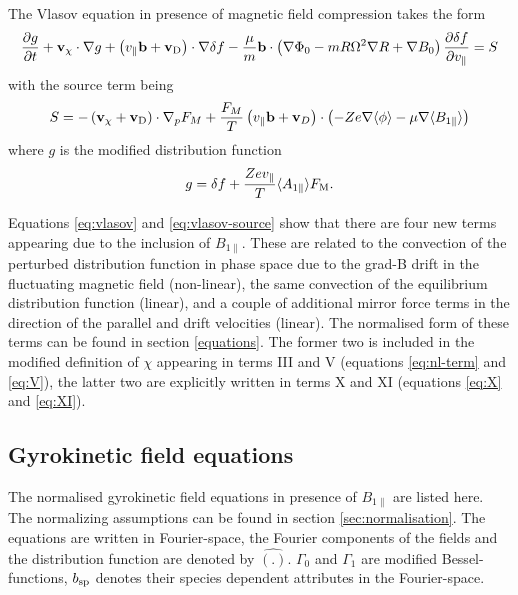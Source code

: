 The Vlasov equation in presence of magnetic field compression takes the form
\begin{equation}
	\frac{\partial g}{\partial t} + \mathbf{v}_{\chi} \cdot \nabla g + \left( v_{\parallel} \mathbf{b} + \mathbf{v}_{\mathrm{D}} \right) \cdot \nabla \delta f - \frac{\mu}{m} \mathbf{b} \cdot \left(\nabla \Phi_0 - m R \Omega^2 \nabla R + \nabla B_0 \right) \frac{\partial \delta f}{\partial v_{\parallel}} = S 
	\label{eq:vlasov}
\end{equation}
with the source term being
\begin{equation}
	S = - \left( \mathbf{v}_{\chi} + \mathbf{v}_{\mathrm{D}} \right) \cdot \nabla_p F_M + \frac{F_M}{T} \left( v_{\parallel} \mathbf{b} + \mathbf{v}_{D} \right) \cdot \left( - Z e \nabla \langle \phi \rangle - \mu \nabla \langle B_{1 \parallel} \rangle \right)
	\label{eq:vlasov-source}
\end{equation}
where $g$ is the modified distribution function
\begin{equation}
	g = \delta f + \frac{Z e v_{\parallel}}{T} \langle A_{1 \parallel} \rangle F_{\mathrm{M}}.
	\label{eq:g}
\end{equation}

Equations \ref{eq:vlasov} and \ref{eq:vlasov-source} show that there
are four new terms appearing due to the inclusion of
$B_{1 \parallel}$. These are related to the convection of the
perturbed distribution function in phase space due to the grad-B drift
in the fluctuating magnetic field (non-linear), the same convection of
the equilibrium distribution function (linear), and a couple of
additional mirror force terms in the direction of the parallel and
drift velocities (linear). The normalised form of these terms can be
found in section \ref{equations}. The former two is included in the
modified definition of $\chi$ appearing in terms III and V (equations
\ref{eq:nl-term} and \ref{eq:V}), the latter two are explicitly written in
terms X and XI (equations \ref{eq:X} and \ref{eq:XI}).


\subsection{Gyrokinetic field equations} 
\label{field-equations}
The normalised gyrokinetic field equations in presence of $B_{1 \parallel}$ are listed here. The normalizing assumptions can be found in section \ref{sec:normalisation}. The equations are written in Fourier-space, the Fourier components of the fields and the distribution function are denoted by $\hat{(.)}$. $\Gamma_0$ and $\Gamma_1$ are modified Bessel-functions, $b_{\mathrm{sp}}$ denotes their species dependent attributes in the Fourier-space.


